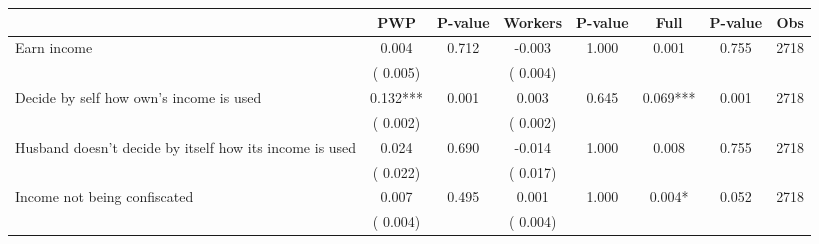 
\begin{tabular}{l*{7}{c}}\hline&\multicolumn{1}{c}{PWP}&\multicolumn{1}{c}{P-value}&\multicolumn{1}{c}{Workers}&\multicolumn{1}{c}{P-value}&\multicolumn{1}{c}{Full}&\multicolumn{1}{c}{P-value}&\multicolumn{1}{c}{Obs} \\ \hline

 Earn income       &              0.004       &        0.712  &             -0.003       &        1.000  &              0.001       &              0.755 &  2718 \\ 
                       &       (       0.005)             &                               &       (       0.004)                     &                               &                                               &                                &                      \\ 

 Decide by self how own's income is used       &              0.132***       &        0.001  &              0.003       &        0.645  &              0.069***       &              0.001 &  2718 \\ 
                       &       (       0.002)             &                               &       (       0.002)                     &                               &                                               &                                &                      \\ 

 Husband doesn't decide by itself how its income is used       &              0.024       &        0.690  &             -0.014       &        1.000  &              0.008       &              0.755 &  2718 \\ 
                       &       (       0.022)             &                               &       (       0.017)                     &                               &                                               &                                &                      \\ 

 Income not being confiscated       &              0.007       &        0.495  &              0.001       &        1.000  &              0.004*       &              0.052 &  2718 \\ 
                       &       (       0.004)             &                               &       (       0.004)                     &                               &                                               &                                &                      \\ 


\end{tabular}
